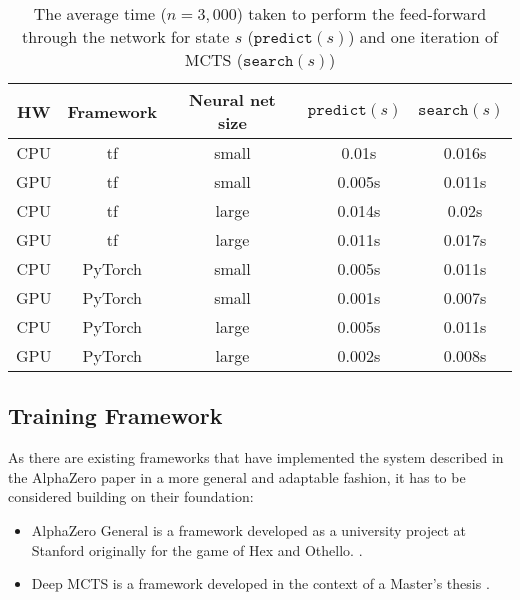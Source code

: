 \begin{table*}
    \begin{center}
        \begin{tabular}{ c|c|c|c|c }
            HW  & Framework & Neural net size & $\texttt{predict}(s)$ & $\texttt{search}(s)$ \\
            \hline
            \hline
            CPU & tf        & small           & ~0.01s                & ~0.016s              \\
            GPU & tf        & small           & ~0.005s               & ~0.011s              \\
            CPU & tf        & large           & ~0.014s               & ~0.02s               \\
            GPU & tf        & large           & ~0.011s               & ~0.017s              \\
            CPU & PyTorch   & small           & ~0.005s               & ~0.011s              \\
            GPU & PyTorch   & small           & ~0.001s               & ~0.007s              \\
            CPU & PyTorch   & large           & ~0.005s               & ~0.011s              \\
            GPU & PyTorch   & large           & ~0.002s               & ~0.008s              \\
        \end{tabular}
    \end{center}
    \caption{The average time ($n = 3,000$) taken to perform the feed-forward through the network for state $s$ ($\texttt{predict}(s)$) and one iteration of MCTS ($\texttt{search}(s)$)}\label{pytorch_vs_tensorflow_performance}
\end{table*}

\subsection{Training Framework}
\label{training_framework}
As there are existing frameworks that have implemented the system described in the AlphaZero paper in a more general and adaptable fashion, it has to be considered building on their foundation:
\begin{itemize}
    \item AlphaZero General is a framework developed as a university project at Stanford originally for the game of Hex and Othello. \cite{thakoor_learning_nodate,thakoor_suragnairalpha-zero-general_nodate}.
    \item Deep MCTS is a framework developed in the context of a Master's thesis \cite{bruasdal_deep_2020,henribru_deep_2021}.
\end{itemize}

